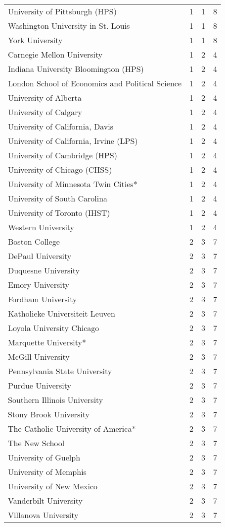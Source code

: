 \begin{longtable}[t]{llll}
University of Pittsburgh (HPS) & 1 & 1 & 8\\
Washington University in St. Louis & 1 & 1 & 8\\
York University & 1 & 1 & 8\\
Carnegie Mellon University & 1 & 2 & 4\\
\addlinespace
Indiana University Bloomington (HPS) & 1 & 2 & 4\\
London School of Economics and Political Science & 1 & 2 & 4\\
University of Alberta & 1 & 2 & 4\\
University of Calgary & 1 & 2 & 4\\
University of California, Davis & 1 & 2 & 4\\
\addlinespace
University of California, Irvine (LPS) & 1 & 2 & 4\\
University of Cambridge (HPS) & 1 & 2 & 4\\
University of Chicago (CHSS) & 1 & 2 & 4\\
University of Minnesota Twin Cities* & 1 & 2 & 4\\
University of South Carolina & 1 & 2 & 4\\
\addlinespace
University of Toronto (IHST) & 1 & 2 & 4\\
Western University & 1 & 2 & 4\\
Boston College & 2 & 3 & 7\\
DePaul University & 2 & 3 & 7\\
Duquesne University & 2 & 3 & 7\\
\addlinespace
Emory University & 2 & 3 & 7\\
Fordham University & 2 & 3 & 7\\
Katholieke Universiteit Leuven & 2 & 3 & 7\\
Loyola University Chicago & 2 & 3 & 7\\
Marquette University* & 2 & 3 & 7\\
\addlinespace
McGill University & 2 & 3 & 7\\
Pennsylvania State University & 2 & 3 & 7\\
Purdue University & 2 & 3 & 7\\
Southern Illinois University & 2 & 3 & 7\\
Stony Brook University & 2 & 3 & 7\\
\addlinespace
The Catholic University of America* & 2 & 3 & 7\\
The New School & 2 & 3 & 7\\
University of Guelph & 2 & 3 & 7\\
University of Memphis & 2 & 3 & 7\\
University of New Mexico & 2 & 3 & 7\\
\addlinespace
Vanderbilt University & 2 & 3 & 7\\
Villanova University & 2 & 3 & 7\\
\bottomrule
\end{longtable}